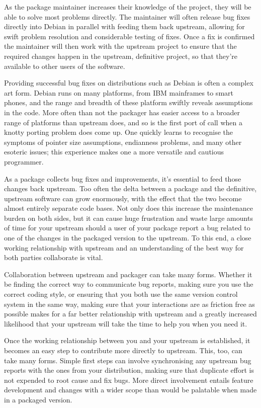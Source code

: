 As the package maintainer increases their knowledge of the project, they will be able to solve most problems directly. The maintainer will often release bug fixes directly into Debian in parallel with feeding them back upstream, allowing for swift problem resolution and considerable testing of fixes. Once a fix is confirmed the maintainer will then work with the upstream project to ensure that the required changes happen in the upstream, definitive project, so that they're available to other users of the software.

Providing successful bug fixes on distributions such as Debian is often a complex art form. Debian runs on many platforms, from IBM mainframes to smart phones, and the range and breadth of these platform swiftly reveals assumptions in the code. More often than not the packager has easier access to a broader range of platforms than upstream does, and so is the first port of call when a knotty 
porting problem does come up. One quickly learns to recognise the symptoms of pointer size assumptions, endianness problems, and many other esoteric issues; this experience makes one a more versatile and cautious programmer. 

As a package collects bug fixes and improvements, it's essential to feed those changes back upstream. Too often the delta between a package and the definitive, upstream software can grow enormously, with the effect that the two become almost entirely separate code bases. Not only does this increase the maintenance burden on both sides, but it can cause huge frustration and waste large amounts of time for your upstream should a user of your package report a bug related to one of the changes in the packaged version to the upstream. To this end, a close working relationship with upstream and an understanding of the best way for both parties collaborate is vital. 

Collaboration between upstream and packager can take many forms. Whether it be finding the correct way to communicate bug reports, making sure you use the correct coding style, or ensuring that you both use the same version control system in the same way, making sure that your interactions are as friction free as possible makes for a far better relationship with upstream and a greatly increased likelihood that your upstream will take the time to help you when you need it. 

Once the working relationship between you and your upstream is established, it becomes an easy step to contribute more directly to upstream. This, too, can take many forms. Simple first steps can involve synchronising any upstream bug reports with the ones from your distribution, making sure that duplicate effort is not expended to root cause and fix bugs. More direct involvement entails feature development and changes with a wider scope than would be palatable when made in a packaged version. 

